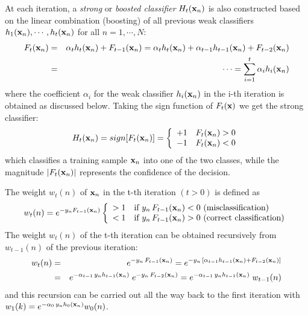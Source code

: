 \documentclass{article}
\begin{document}
At each iteration, a {\em strong} or {\em boosted classifier} 
$H_t({\bf x}_n)$ is also constructed based on the linear combination 
(boosting) of all previous weak classifiers $h_1({\bf x}_n),\cdots,
h_t({\bf x}_n)$ for all $n=1,\cdots,N$:
\begin{eqnarray}
  F_t({\bf x}_n)&=&\alpha_th_t({\bf x}_n)+F_{t-1}({\bf x}_n)
  =\alpha_th_t({\bf x}_n)+\alpha_{t-1}h_{t-1}({\bf x}_n)+F_{t-2}({\bf x}_n)
  \nonumber\\
  &=&\cdots=\sum_{i=1}^t\alpha_ih_i({\bf x}_n)
  \label{StrongClassifierF}
\end{eqnarray}
where the coefficient $\alpha_i$ for the weak classifier 
$h_i({\bf x}_n)$ in the i-th iteration is obtained as discussed 
below. Taking the sign function of $F_t({\bf x})$ we get the strong 
classifier:
\begin{equation}
  H_t({\bf x}_n)=sign [F_t({\bf x}_n)]=\left\{\begin{array}{ll}
  +1 & F_t({\bf x}_n)>0\\-1 & F_t({\bf x}_n)<0\end{array}\right.
\end{equation}
which classifies a training sample ${\bf x}_n$ into one of the two 
classes, while the magnitude $|F_t({\bf x}_n)|$ represents the confidence 
of the decision.

The weight $w_t(n)$ of ${\bf x}_n$ in the t-th iteration $(t>0)$ is
defined as 
\begin{equation}
  w_t(n)=e^{-y_n F_{t-1}({\bf x}_n)}\left\{\begin{array}{ll}
  >1 & \mbox{if $y_n\,F_{t-1}({\bf x}_n)<0$ (misclassification)}\\
  <1 & \mbox{if $y_n\,F_{t-1}({\bf x}_n)>0$ (correct classification)}
  \end{array}\right.
\end{equation}
The weight $w_t(n)$ of the t-th iteration can be obtained recursively 
from $w_{t-1}(n)$ of the previous iteration:
\begin{eqnarray}
  w_t(n)&=&e^{-y_n\,F_{t-1}({\bf x}_n)}
  =e^{-y_n\,[\alpha_{t-1}h_{t-1}({\bf x}_n)+F_{t-2}({\bf x}_n)]}
  \nonumber\\
  &=&e^{-\alpha_{t-1}\,y_nh_{t-1}({\bf x}_n)}\;e^{-y_n\,F_{t-2}({\bf x}_n)}
  =e^{-\alpha_{t-1}\,y_nh_{t-1}({\bf x}_n)}\;w_{t-1}(n)
  \label{weightupdate}
\end{eqnarray}
and this recursion can be carried out all the way back to the first 
iteration with $w_1(k)=e^{-\alpha_0 \,y_nh_0({\bf x}_n)}w_0(n)$. 
\end{document}
